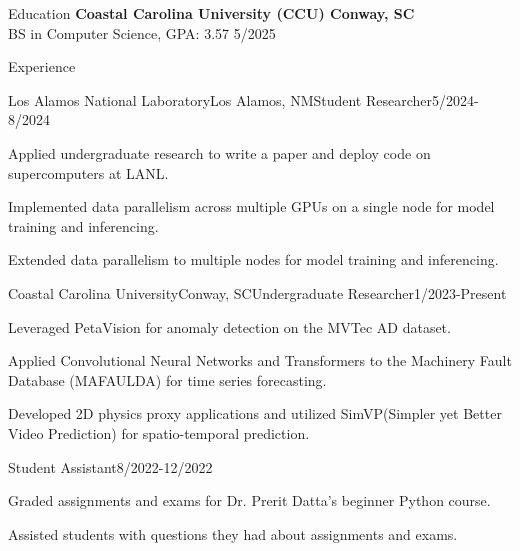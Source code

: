 \documentclass{resume} %
\begin{document}

\begin{rSection}{Education}
  \itemsep -1pt {} 
{\bf Coastal Carolina University (CCU) \hfill Conway, SC} \\
BS in Computer Science, GPA: 3.57 \hfill 5/2025 %
\end{rSection}

\begin{rSection}{Experience}
  \itemsep -1pt {} 
\begin{rSubsection}{Los Alamos National Laboratory}{Los Alamos, NM}{Student Researcher}{5/2024-8/2024}
  \item Applied undergraduate research to write a paper and deploy code on supercomputers at LANL.
  \item Implemented data parallelism across multiple GPUs on a single node for model training and inferencing.
  \item Extended data parallelism to multiple nodes for model training and inferencing.
\end{rSubsection}

\begin{rSubsection}{Coastal Carolina University}{Conway, SC}{Undergraduate Researcher}{1/2023-Present}
  \item Leveraged PetaVision for anomaly detection on the MVTec AD dataset.
  \item Applied Convolutional Neural Networks and Transformers to the Machinery Fault Database (MAFAULDA) for time series forecasting.
  \item Developed 2D physics proxy applications and utilized SimVP(Simpler yet Better Video Prediction) for spatio-temporal prediction.
\end{rSubsection}

\begin{rSubsection}{}{}{Student Assistant}{8/2022-12/2022}
  \item Graded assignments and exams for Dr. Prerit Datta's beginner Python course.
  \item Assisted students with questions they had about assignments and exams.
\end{rSubsection}


\end{rSection}
\end{document}
